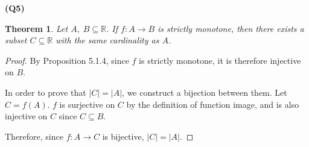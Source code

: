 \documentclass[12pt, a4paper]{article}
\newcommand{\R}{\mathbb{R}}
\newcommand{\sse}{\subseteq}
\newtheorem{theorem}{Theorem}
\begin{document}
\noindent\textbf{(Q5)}

\begin{theorem}
    Let $A,\;B \sse \R$. If $f \colon A \to B$ is strictly monotone, then there
    exists a subset $C \sse \R$ with the same cardinality as $A$.
\end{theorem}

\begin{proof}
    By Proposition 5.1.4, since $f$ is strictly monotone, it is therefore injective
    on $B$.

    In order to prove that $|C| = |A|$, we construct a bijection between them.
    Let $C = f(A)$. $f$ is surjective on $C$ by the definition of function image,
    and is also injective on $C$ since $C \sse B$.

    Therefore, since $f \colon A \to C$ is bijective, $|C| = |A|$.
\end{proof}
\end{document}

